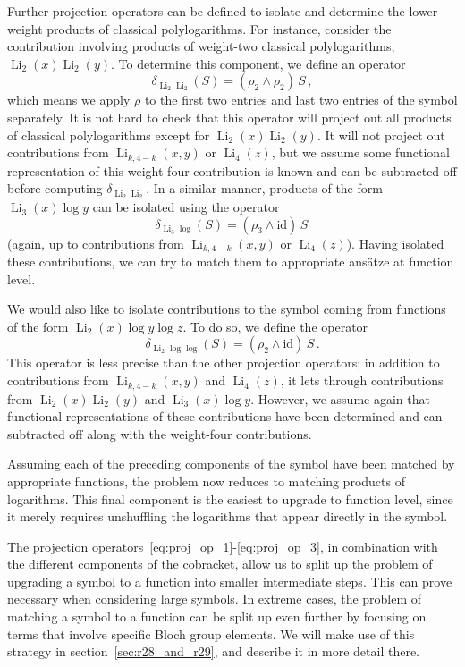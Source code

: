 \documentclass[11pt]{article}
\DeclareMathOperator{\Li}{Li}
\begin{document}
Further projection operators can be defined to isolate and determine the lower-weight products of classical polylogarithms. For instance, consider the contribution involving products of weight-two classical polylogarithms, $\Li_2(x) \Li_2(y)$. To determine this component, we define an operator
\begin{equation}
\delta_{\Li_2 \Li_2} (S)= (\rho_2 \wedge \rho_2)\, S \, , \label{eq:proj_op_1}
\end{equation}
which means we apply $\rho$ to the first two entries and last two entries of the symbol separately. It is not hard to check that this operator will project out all products of classical polylogarithms except for $\Li_2(x) \Li_2(y)$. It will not project out contributions from $\Li_{k,4-k}(x,y)$ or $\Li_4(z)$, but we assume some functional representation of this weight-four contribution is known and can be subtracted off before computing $\delta_{\Li_2 \Li_2}$. In a similar manner, products of the form $\Li_3(x) \log y$ can be isolated using the operator
\begin{equation}
\delta_{\Li_3 \log} (S)= (\rho_3 \wedge \text{id})\, S \,  \label{eq:proj_op_2} 
\end{equation}
(again, up to contributions from $\Li_{k,4-k}(x,y)$ or $\Li_4(z)$).  Having isolated these contributions, we can try to match them to appropriate ans{\"a}tze at function level.

We would also like to isolate contributions to the symbol coming from functions of the form $\Li_2(x) \log y  \log z$. To do so, we define the operator
\begin{equation}
\delta_{\Li_2 \log \log} (S)= (\rho_2 \wedge \text{id})\, S \, . \label{eq:proj_op_3}
\end{equation}
This operator is less precise than the other projection operators; in addition to contributions from $\Li_{k,4-k}(x,y)$ and $\Li_4(z)$, it lets through contributions from $\Li_2(x) \Li_2(y)$ and $\Li_3(x) \log y$. However, we assume again that functional representations of these contributions have been determined and can subtracted off along with the weight-four contributions. 

Assuming each of the preceding components of the symbol have been matched by appropriate functions, the problem now reduces to matching products of logarithms. This final component is the easiest to upgrade to function level, since it merely requires unshuffling the logarithms that appear directly in the symbol.  
 
The projection operators~\eqref{eq:proj_op_1}-\eqref{eq:proj_op_3}, in combination with the different components of the cobracket, allow us to split up the problem of upgrading a symbol to a function into smaller intermediate steps. This can prove necessary when considering large symbols. In extreme cases, the problem of matching a symbol to a function can be split up even further by focusing on terms that involve specific Bloch group elements. We will make use of this strategy in section~\ref{sec:r28_and_r29}, and describe it in more detail there. 
\end{document}
